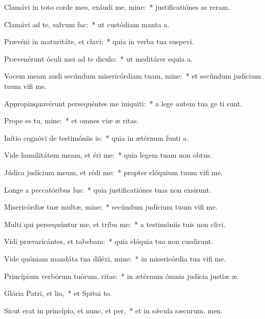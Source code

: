 \item Clamávi in toto corde meo, exáudi me, mine:~* justificatiónes as reram.
\item Clamávi ad te, salvum  fac:~* ut custódiam manta a.
\item Prævéni in maturitáte, et clavi:~* quia in verba tua suspevi.
\item Prævenérunt óculi mei ad te diculo:~* ut meditárer equia a.
\item Vocem meam audi secúndum misericórdiam tuam, mine:~* et secúndum judícium tuum vifi me.
\item Appropinquavérunt persequéntes me iniquiti:~* a lege autem tua ge ti sunt.
\item Prope es tu, mine:~* et omnes viæ æ ritas.
\item Inítio cognóvi de testimóniis is:~* quia in ætérnum funti a.
\item Vide humilitátem meam, et éri me:~* quia legem tuam non  obtus.
\item Júdica judícium meum, et rédi me:~* propter elóquium tuum vifi me.
\item Longe a peccatóribus lus:~* quia justificatiónes tuas non exsirunt.
\item Misericórdiæ tuæ multæ, mine:~* secúndum judícium tuum vifi me.
\item Multi qui persequúntur me, et tríbu me:~* a testimóniis tuis non clivi.
\item Vidi prævaricántes, et tabebam:~* quia elóquia tua non cusdirunt.
\item Vide quóniam mandáta tua diléxi, mine:~* in misericórdia tua vifi me.
\item Princípium verbórum tuórum, ritas:~* in ætérnum ómnia judícia justiæ æ.
\item Glória Patri, et lio,~* et Spitui to.
\item Sicut erat in princípio, et nunc, et per,~* et in sǽcula sæcurum. men.
